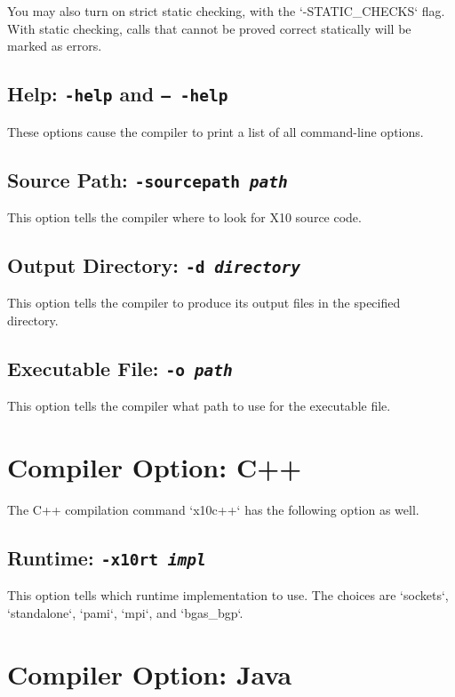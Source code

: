You may also turn on strict static checking, with the \xcd`-STATIC_CHECKS` flag.  With
static checking, calls that cannot be proved correct statically will be
marked as errors.  


\subsection{Help: {\tt -help} and {\tt -- -help}}

These options cause the compiler to print a list of all command-line options.


\subsection{Source Path: {\tt -sourcepath {\em path}}}

This option tells the compiler where to look for X10 source code.  


\subsection{Output Directory: {\tt -d {\em directory}}}

This option tells the compiler to produce its output files in the specified directory.


\subsection{Executable File: {\tt -o {\em path}}}

This option tells the compiler what path to use for the executable file. 


\section{Compiler Option: C++}

The C++ compilation command \xcd`x10c++` has the following option as well. 

\subsection{Runtime: {\tt -x10rt {\em impl}}}

This option tells which runtime implementation to use.  The choices are
\xcd`sockets`, \xcd`standalone`, \xcd`pami`, \xcd`mpi`, and \xcd`bgas_bgp`.


\section{Compiler Option: Java}

